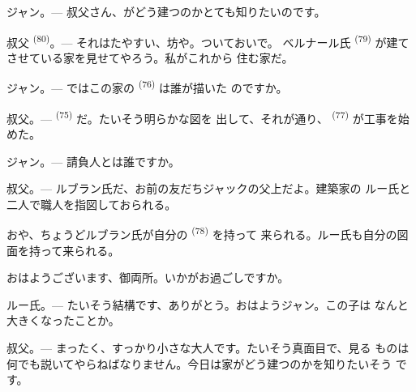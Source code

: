 %
%

\VUsaut{6.0mm}
\VUsaut{1.4mm}
\VUsaut{2.2mm}

\VUsaut{3.0mm}

\textsc{ジャン}。--- 叔父さん、がどう建つのかとても知りたいのです。

\textsc{叔父} \textsuperscript{(80)}。--- それはたやすい、坊や。ついておいで。
ベルナール氏 \textsuperscript{(79)} が建てさせている家を見せてやろう。私がこれから
住む家だ。

\textsc{ジャン}。--- ではこの家の \textsuperscript{(76)} は誰が描いた
のですか。

\textsc{叔父}。---  \textsuperscript{(75)} だ。たいそう明らかな図を
出して、それが通り、 \textsuperscript{(77)} が工事を始めた。

\textsc{ジャン}。--- 請負人とは誰ですか。

\textsc{叔父}。--- ルブラン氏だ、お前の友だちジャックの父上だよ。建築家の
ルー氏と二人で職人を指図しておられる。

おや、ちょうどルブラン氏が自分の \textsuperscript{(78)} を持って
来られる。ルー氏も自分の図面を持って来られる。

おはようございます、御両所。いかがお過ごしですか。

\textsc{ルー氏}。--- たいそう結構です、ありがとう。おはようジャン。この子は
なんと大きくなったことか。

\textsc{叔父}。--- まったく、すっかり小さな大人です。たいそう真面目で、見る
ものは何でも説いてやらねばなりません。今日は家がどう建つのかを知りたいそう
です。

